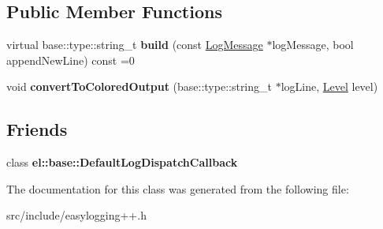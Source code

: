 \subsection*{Public Member Functions}
\begin{DoxyCompactItemize}
\item 
\mbox{\label{classel_1_1_log_builder_a633b373a3bb9d3e17bdd664aeba4dbc8}} 
virtual base\+::type\+::string\+\_\+t {\bfseries build} (const \hyperlink{classel_1_1_log_message}{Log\+Message} $\ast$log\+Message, bool append\+New\+Line) const =0
\item 
\mbox{\label{classel_1_1_log_builder_a229244f323f25bdbd7725f8bbf983a17}} 
void {\bfseries convert\+To\+Colored\+Output} (base\+::type\+::string\+\_\+t $\ast$log\+Line, \hyperlink{namespaceel_ab0ac6091262344c52dd2d3ad099e8e36}{Level} level)
\end{DoxyCompactItemize}
\subsection*{Friends}
\begin{DoxyCompactItemize}
\item 
\mbox{\label{classel_1_1_log_builder_a42b1de96d584ae4fecbfc2b9aff95052}} 
class {\bfseries el\+::base\+::\+Default\+Log\+Dispatch\+Callback}
\end{DoxyCompactItemize}


The documentation for this class was generated from the following file\+:\begin{DoxyCompactItemize}
\item 
src/include/easylogging++.\+h\end{DoxyCompactItemize}
